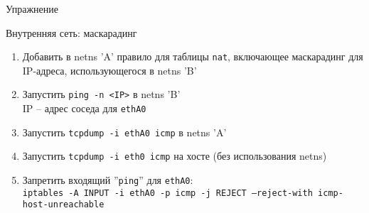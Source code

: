 \begin{frame}[fragile]{Упражнение}
    \begin{block}{Внутренняя сеть: маскарадинг}
        \begin{enumerate}
            \item Добавить в netns 'A' правило для таблицы {\tt nat},
                включающее маскарадинг для IP-адреса, использующегося в netns 'B'
            \item Запустить {\tt ping -n <IP>} в netns 'B'\\
                IP -- адрес соседа для {\tt ethA0}
            \item Запустить {\tt tcpdump -i ethA0 icmp} в netns 'A'
            \item Запустить {\tt tcpdump -i eth0 icmp} на хосте (без использования netns)
            \item Запретить входящий ''{\tt ping}'' для {\tt ethA0}:\\
                {\tt iptables -A INPUT -i ethA0 -p icmp -j REJECT --reject-with icmp-host-unreachable}
        \end{enumerate}
    \end{block}
\end{frame}
